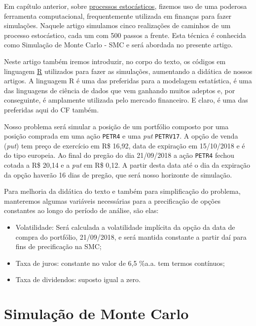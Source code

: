 \documentclass[]{book}
\theoremstyle{definition}
\theoremstyle{definition}
\theoremstyle{definition}
\theoremstyle{remark}
\begin{document}
Em capítulo anterior, sobre \protect\hyperlink{processos-estocasticos}{processos estocásticos}, fizemos uso de uma poderosa ferramenta computacional, frequentemente utilizada em finanças para fazer simulações. Naquele artigo simulamos cinco realizações de caminhos de um processo estocástico, cada um com 500 passos a frente. Esta técnica é conhecida como Simulação de Monte Carlo - SMC e será abordada no presente artigo.

Neste artigo também iremos introduzir, no corpo do texto, os códigos em linguagem \href{https://cran.r-project.org/}{R} utilizados para fazer as simulações, aumentando a didática de nossos artigos. A linguagem R é uma das preferidas para a modelagem estatística, é uma das linguagens de ciência de dados que vem ganhando muitos adeptos e, por conseguinte, é amplamente utilizada pelo mercado financeiro. E claro, é uma das preferidas aqui do CF também.

Nosso problema será simular a posição de um portfólio composto por uma posição comprada em uma ação \texttt{PETR4} e uma \emph{put} \texttt{PETRV17}. A opção de venda (\emph{put}) tem preço de exercício em R\$ 16,92, data de expiração em 15/10/2018 e é do tipo europeia. Ao final do pregão do dia 21/09/2018 a ação \texttt{PETR4} fechou cotada a R\$ 20,14 e a \emph{put} em R\$ 0,12. A partir desta data até o dia da expiração da opção haverão 16 dias de pregão, que será nosso horizonte de simulação.

Para melhoria da didática do texto e também para simplificação do problema, manteremos algumas variáveis necessárias para a precificação de opções constantes ao longo do período de análise, são elas:

\begin{itemize}
\item
  Volatilidade: Será calculada a volatilidade implícita da opção da data de compra do portfólio, 21/09/2018, e será mantida constante a partir daí para fins de precificação na SMC;
\item
  Taxa de juros: constante no valor de 6,5 \%a.a. tem termos contínuos;
\item
  Taxa de dividendos: suposto igual a zero.
\end{itemize}

\hypertarget{simulacao-de-monte-carlo}{%
\section{Simulação de Monte Carlo}\label{simulacao-de-monte-carlo}}
\end{document}
